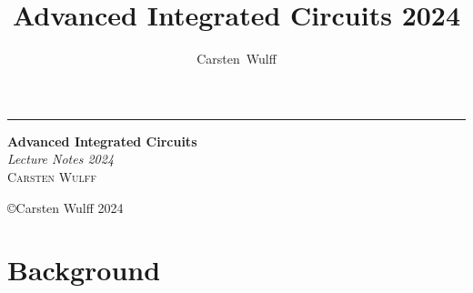 \documentclass[11pt,twoside,openright]{kaobook}
\title{Advanced Integrated Circuits 2024}
\author{Carsten~Wulff}
\date{}
\begin{document}
\begin{titlepage} %

	\raggedleft %

	\rule{1pt}{\textheight} %
	\hspace{0.05\textwidth} %
	\parbox[b]{0.75\textwidth}{ %

		{\Huge\bfseries Advanced Integrated Circuits}\\[2\baselineskip] %
		{\large\textit{Lecture Notes 2024}}\\[4\baselineskip] %
		{\Large\textsc{Carsten Wulff}} %

		\vspace{0.5\textheight} %

    

		{\noindent \copyright Carsten Wulff 2024}\\[\baselineskip] %
	}

\end{titlepage}



{
\hypersetup{linkcolor=}
\setcounter{tocdepth}{2}
\tableofcontents
}



\mainmatter

\chapter{Background}



%

%
\end{document}
